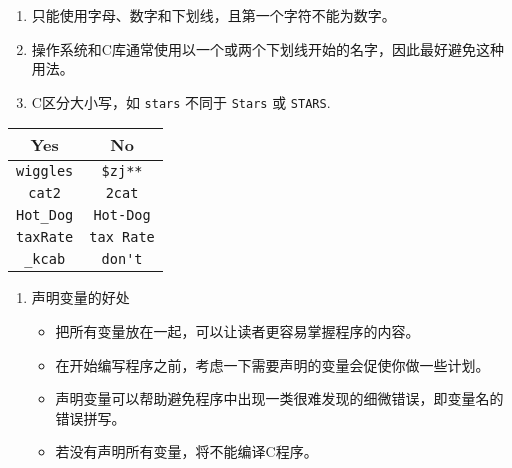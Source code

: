 \begin{frame}[fragile]
  \begin{free}[命名规则]{} 
      \begin{enumerate}
      \item 只能使用字母、数字和下划线，且第一个字符不能为数字。 \\[0.1in]
      \item 操作系统和C库通常使用以一个或两个下划线开始的名字，因此最好避免这种用法。 \\[0.1in]
      \item C区分大小写，如 \lstinline|stars| 不同于 \lstinline|Stars| 或 \lstinline|STARS|.
      \end{enumerate}
    \end{free}



  \begin{table}
    \centering
    \begin{tabular}{c|c}\hline
      Yes& No\\[0.1in]\hline
      \lstinline|wiggles|  &  \lstinline|$zj**|\\[0.1in]
      \lstinline|cat2|     &  \lstinline|2cat|\\[0.1in]
      \lstinline|Hot_Dog|  &  \lstinline|Hot-Dog|\\[0.1in]
      \lstinline|taxRate|  &  \lstinline|tax Rate|\\[0.1in]
      \lstinline|_kcab|    &  \lstinline|don't|\\\hline
    \end{tabular}
  \end{table}
\end{frame}


\begin{frame}[fragile]
  \begin{enumerate}[3]
  \item 声明变量的好处\\[0.1in]
    \begin{itemize}
    \item 把所有变量放在一起，可以让读者更容易掌握程序的内容。
      \\[0.1in]
    \item 在开始编写程序之前，考虑一下需要声明的变量会促使你做一些计划。\\[0.1in]
    \item 声明变量可以帮助避免程序中出现一类很难发现的细微错误，即变量名的错误拼写。\\[0.1in]
    \item 若没有声明所有变量，将不能编译C程序。

    \end{itemize}
  \end{enumerate}
\end{frame}


